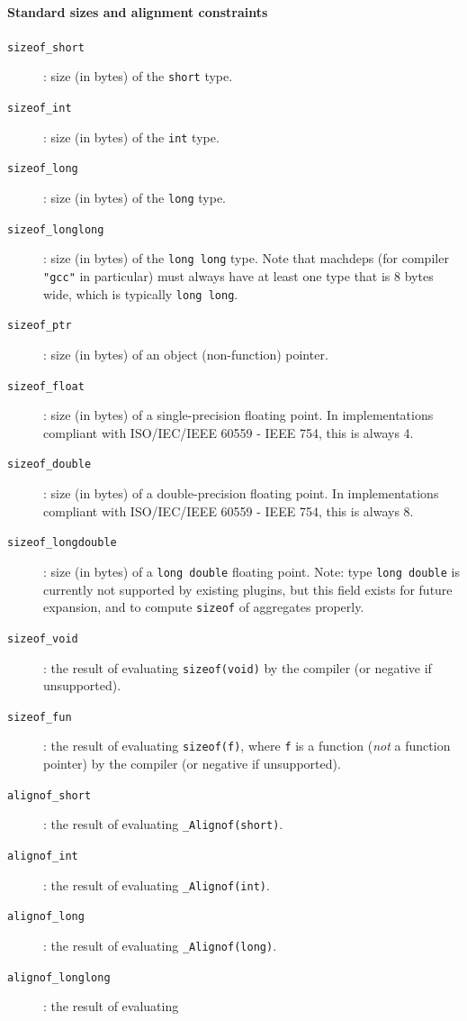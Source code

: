 \paragraph{Standard sizes and alignment constraints}
\begin{description}
  \item[\texttt{sizeof\_short}]: size (in bytes) of the \verb+short+ type.
  \item[\texttt{sizeof\_int}]: size (in bytes) of the \verb+int+ type.
  \item[\texttt{sizeof\_long}]: size (in bytes) of the \verb+long+ type.
  \item[\texttt{sizeof\_longlong}]: size (in bytes) of the \verb+long long+
    type.
    Note that machdeps (for compiler \verb+"gcc"+ in particular) must always
    have at least one type that is 8 bytes wide, which is typically
    \verb+long long+.
  \item[\texttt{sizeof\_ptr}]: size (in bytes) of an object (non-function)
    pointer.
  \item[\texttt{sizeof\_float}]: size (in bytes) of a single-precision floating
    point. In implementations compliant with ISO/IEC/IEEE 60559 - IEEE 754,
    this is always 4.
  \item[\texttt{sizeof\_double}]: size (in bytes) of a double-precision floating
    point. In implementations compliant with ISO/IEC/IEEE 60559 - IEEE 754,
    this is always 8.
  \item[\texttt{sizeof\_longdouble}]: size (in bytes) of a \verb+long double+
    floating point.
    Note: type \verb+long double+ is currently not supported by existing
    \framac plugins,  but this field exists for future expansion, and
    to compute \verb+sizeof+ of aggregates properly.
  \item[\texttt{sizeof\_void}]: the result of evaluating \verb+sizeof(void)+
    by the compiler (or negative if unsupported).
  \item[\texttt{sizeof\_fun}]: the result of evaluating \verb+sizeof(f)+, where
    \verb+f+ is a function ({\em not} a function pointer) by the compiler
    (or negative if unsupported).
  \item[\texttt{alignof\_short}]: the result of evaluating
    \verb+_Alignof(short)+.
  \item[\texttt{alignof\_int}]: the result of evaluating \verb+_Alignof(int)+.
  \item[\texttt{alignof\_long}]: the result of evaluating \verb+_Alignof(long)+.
  \item[\texttt{alignof\_longlong}]: the result of evaluating

\end{description}
